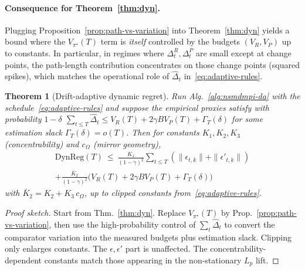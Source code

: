 \documentclass{article}
\theoremstyle{plain}
\newtheorem{theorem}{Theorem}[section]
\theoremstyle{definition}
\theoremstyle{remark}
\newcommand{\1}{\mathbbm{1}}
\begin{document}
\paragraph{Consequence for Theorem~\ref{thm:dyn}.}
Plugging Proposition~\ref{prop:path-vs-variation} into Theorem~\ref{thm:dyn} yields a bound where the
$V_{\pi^\star}(T)$ term is \emph{itself} controlled by the budgets $(V_R,V_P)$ up to constants. In
particular, in regimes where $\Delta^R_t,\Delta^P_t$ are small except at change points, the path-length
contribution concentrates on those change points (squared spikes), which matches the operational role of
\(\widehat{\Delta}_t\) in~\eqref{eq:adaptive-rules}.

\begin{theorem}[Drift-adaptive dynamic regret]
\label{thm:adaptive}
Run Alg.~\ref{alg:nsmdmpi-da} with the schedule~\eqref{eq:adaptive-rules} and suppose the empirical
proxies satisfy with probability $1-\delta$
\(
\sum_{t\le T}\widehat{\Delta}_t \le V_R(T)+2\gamma B V_P(T)+\Gamma_T(\delta)
\)
for some estimation slack $\Gamma_T(\delta)=o(T)$. Then for constants $K_1,K_2,K_3$ (concentrability) and
$c_\Omega$ (mirror geometry),
\begin{align}
\mathrm{DynReg}(T)
\ \le\ \frac{K_1}{(1-\gamma)^2}\!\sum_{t\le T}(\|\epsilon_{t,k}\|+\|\epsilon'_{t,k}\|) \\
 + \frac{\bar K_2}{(1-\gamma)^2}\Big(V_R(T)+2\gamma B V_P(T)+\Gamma_T(\delta)\Big)
\end{align}
with $\bar K_2 = K_2 + K_3\,c_\Omega$, up to clipped constants from~\eqref{eq:adaptive-rules}.
\end{theorem}

\begin{proof}[Proof sketch]
Start from Thm.~\ref{thm:dyn}. Replace $V_{\pi^\star}(T)$ by Prop.~\ref{prop:path-vs-variation}, then use the
high-probability control of $\sum_t\widehat{\Delta}_t$ to convert the comparator variation into the measured budgets plus estimation slack.
Clipping only enlarges constants. The $\epsilon,\epsilon'$ part is unaffected. The concentrability-dependent constants match those appearing in the non-stationary $L_p$ lift. 
\end{proof}
\end{document}
